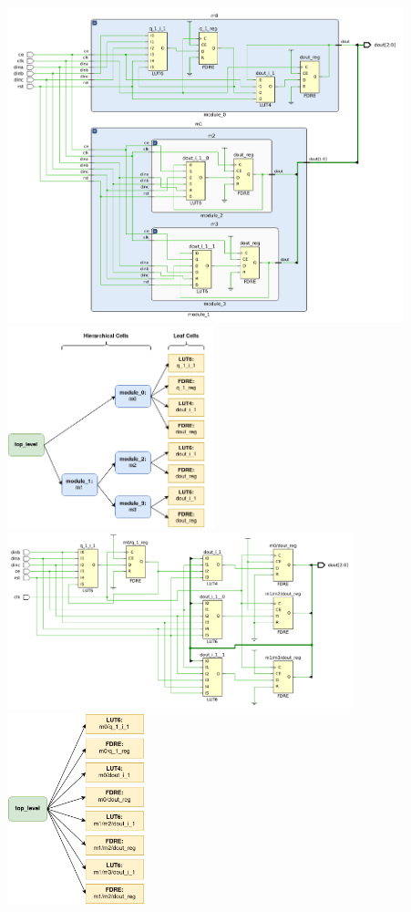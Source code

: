 \documentclass{article}
\begin{document}
    {
        \centering
        \includegraphics[valign=c, width=11.5cm]{figures/netlist_synth/hier_netlist.png}
        \includegraphics[valign=c, width=6cm]{figures/netlist_synth/hier_graph.png}
        \label{fig:hier_netlist}
    }
    \vspace{0.5cm}
    {
        \centering
        \includegraphics[valign=c, width=10cm]{figures/netlist_synth/flat_netlist.png}
        \includegraphics[valign=c, width=4cm]{figures/netlist_synth/flat_graph.png}
        \label{fig:flat_netlist}
    }
\end{document}
